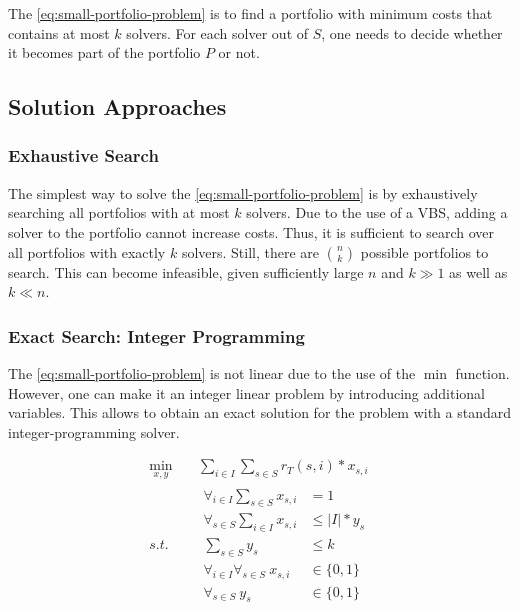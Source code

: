 \documentclass[conference]{IEEEtran}
\begin{document}
The \ref{eq:small-portfolio-problem} is to find a portfolio with minimum costs that contains at most $k$ solvers.
For each solver out of $S$, one needs to decide whether it becomes part of the portfolio $P$ or not.

\subsection{Solution Approaches}
\label{sec:approach:solution}

\subsubsection{Exhaustive Search}

The simplest way to solve the \ref{eq:small-portfolio-problem} is by exhaustively searching all portfolios with at most $k$ solvers.
Due to the use of a VBS, adding a solver to the portfolio cannot increase costs.
Thus, it is sufficient to search over all portfolios with exactly $k$ solvers.
Still, there are $\binom{n}{k}$ possible portfolios to search.
This can become infeasible, given sufficiently large $n$ and $k \gg 1$ as well as $k \ll n$.

\subsubsection{Exact Search: Integer Programming}

The \ref{eq:small-portfolio-problem} is not linear due to the use of the $\min$ function.
However, one can make it an integer linear problem by introducing additional variables.
This allows to obtain an exact solution for the problem with a standard integer-programming solver.

\begin{equation}
	\label{eq:small-portfolio-integer-problem}
	\begin{aligned}
		\min_{x,y} \quad & \sum_{i \in I} \sum_{s \in S} r_T(s,i) * x_{s,i} \\
		s.t. \quad & \begin{aligned}
			\forall_{i\in I} \sum_{s \in S} x_{s,i} &= 1\\
			\forall_{s \in S} \sum_{i \in I} x_{s,i} &\leq |I| * y_s\\
			\sum_{s \in S} y_s &\leq k\\
			\forall_{i\in I} \forall_{s \in S}~x_{s,i} &\in \{0, 1\}\\
			\forall_{s \in S}~y_s &\in \{0,1\}
		\end{aligned}
	\end{aligned}
	\tag{Small-Portfolio Integer Problem}
\end{equation}
\end{document}
